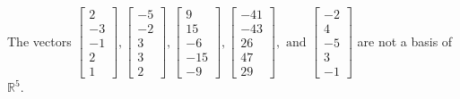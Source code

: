 \begin{exercise}
\begin{exerciseStatement}
  \end{exerciseStatement}
  \begin{exerciseAnswer}
   The vectors \(\left[\begin{array}{r}
2 \\
-3 \\
-1 \\
2 \\
1
\end{array}\right] , \left[\begin{array}{r}
-5 \\
-2 \\
3 \\
3 \\
2
\end{array}\right] , \left[\begin{array}{r}
9 \\
15 \\
-6 \\
-15 \\
-9
\end{array}\right] , \left[\begin{array}{r}
-41 \\
-43 \\
26 \\
47 \\
29
\end{array}\right] , \text{ and } \left[\begin{array}{r}
-2 \\
4 \\
-5 \\
3 \\
-1
\end{array}\right]\) 
  	 are not  a basis of \(\mathbb{R}^5\).
  


  \end{exerciseAnswer}
\end{exercise}